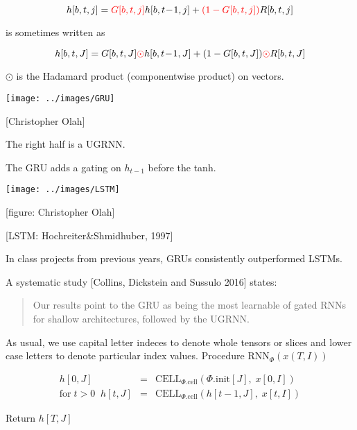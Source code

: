 {

$$h[b,t,j] =  {\color{red} G[b,t,j]}h[b,t\!-\!1,j] + {\color{red} (1-G[b,t,j])}R[b,t,j]$$

\vfill
is sometimes written as

$$h[b,t,J] =  G[b,t,J]{\color{red} \odot} h[b,t\!-\!1,J] + (1-G[b,t,J]){\color{red} \odot} R[b,t,J]$$

\vfill
$\odot$ is the Hadamard product (componentwise product) on vectors.


\centerline{\texttt{[image: ../images/GRU]}}
\centerline{{\huge [Christopher Olah]}}

\vfill
The right half is a UGRNN.

\vfill
The GRU adds a gating on $h_{t-1}$ before the tanh.

\centerline{\texttt{[image: ../images/LSTM]}}
\centerline{{\large [figure: Christopher Olah]}}

\centerline{\Large [LSTM: Hochreiter\&Shmidhuber, 1997]}


\vfill
In class projects from previous years, GRUs consistently outperformed LSTMs.

\vfill
A systematic study [Collins, Dickstein and Sussulo 2016] states:

\begin{quotation}
  Our results point to the GRU as being the most learnable of gated RNNs for shallow architectures, followed by the UGRNN.
\end{quotation}

As usual, we use capital letter indeces to denote whole tensors or slices and lower case letters to denote particular index values.
\vfill
Procedure $\mathrm{RNN}_\Phi(x(T,I))$

\begin{eqnarray*}
h[0,J] &  = &  \mathrm{CELL}_{\Phi.\mathrm{cell}}(\Phi.\mathrm{init}[J],\;x[0,I]) \\
\mathrm{for}\;t>0\;\;h[t,J] &  =  & \mathrm{CELL}_{\Phi.\mathrm{cell}}(h[t-1,J],\;x[t,I])
\end{eqnarray*}

\vfill
Return $h[T,J]$




}
